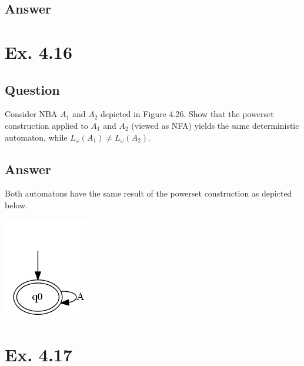 \documentclass[12pt]{article}
\begin{document}
\subsection*{Answer}

\newpage
\section*{Ex. 4.16}
\subsection*{Question}
Consider NBA $A_1$ and $A_2$ depicted in Figure 4.26. Show that the powerset
construction applied to $A_1$ and $A_2$ (viewed as NFA) yields the same deterministic automaton,
while $L_\omega(A_1) \neq L_\omega(A_2)$.

\subsection*{Answer}
Both automatons have the same result of the powerset construction as depicted below.
\begin{centering}
	\includegraphics*[scale=0.5]{ex416.png}
\end{centering}

\section*{Ex. 4.17}
\end{document}
